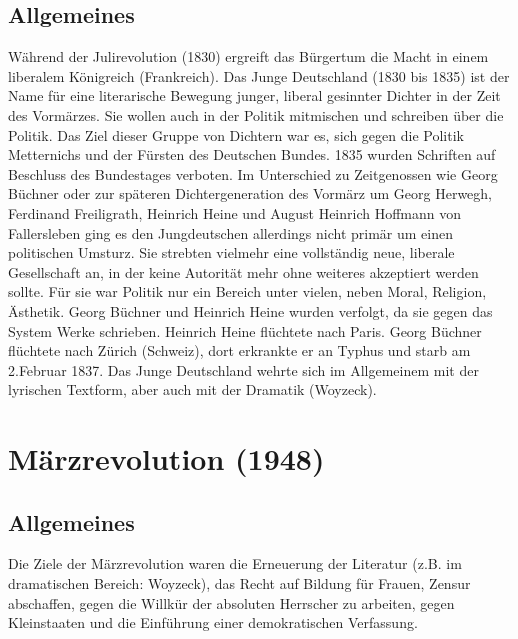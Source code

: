 \documentclass[12pt,a4paper]{article}
\begin{document}
\subsection{Allgemeines}
Während der Julirevolution (1830) ergreift das Bürgertum die Macht in einem liberalem Königreich (Frankreich). Das Junge Deutschland (1830 bis 1835) ist der Name für eine literarische Bewegung junger, liberal gesinnter Dichter in der Zeit des Vormärzes. Sie wollen auch in der Politik mitmischen und schreiben über die Politik. Das Ziel dieser Gruppe von Dichtern war es, sich gegen die Politik Metternichs und der Fürsten des Deutschen Bundes. 1835 wurden Schriften auf Beschluss des Bundestages verboten.
\newline
\newline
Im Unterschied zu Zeitgenossen wie Georg Büchner oder zur späteren Dichtergeneration des Vormärz um Georg Herwegh, Ferdinand Freiligrath, Heinrich Heine und August Heinrich Hoffmann von Fallersleben ging es den Jungdeutschen allerdings nicht primär um einen politischen Umsturz. Sie strebten vielmehr eine vollständig neue, liberale Gesellschaft an, in der keine Autorität mehr ohne weiteres akzeptiert werden sollte. Für sie war Politik nur ein Bereich unter vielen, neben Moral, Religion, Ästhetik.
\newline
\newline
Georg Büchner und Heinrich Heine wurden verfolgt, da sie gegen das System Werke schrieben. Heinrich Heine flüchtete nach Paris. Georg Büchner flüchtete nach Zürich (Schweiz), dort erkrankte er an Typhus und starb am 2.Februar 1837.
\newline
\newline
Das Junge Deutschland wehrte sich im Allgemeinem mit der lyrischen Textform, aber auch mit der Dramatik (Woyzeck).

\newpage

\section{Märzrevolution (1948)}

\subsection{Allgemeines}
Die Ziele der Märzrevolution waren die Erneuerung der Literatur (z.B. im dramatischen Bereich: Woyzeck), das Recht auf Bildung für Frauen, Zensur abschaffen, gegen die Willkür der absoluten Herrscher zu arbeiten, gegen Kleinstaaten und die Einführung einer demokratischen Verfassung.
\newline
\newline
\end{document}
